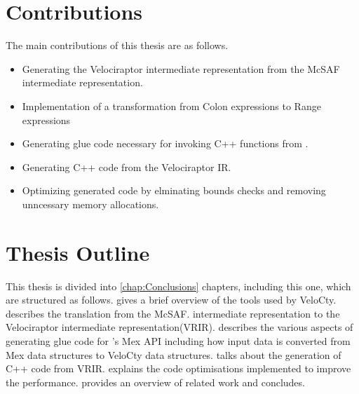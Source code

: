 \section{Contributions}
The main contributions of this thesis are as follows.
\begin{itemize}
\item Generating the Velociraptor\cite{velociraptor} intermediate representation from the McSAF\cite{doherty11} intermediate representation. 
\item Implementation of a transformation from  Colon expressions to Range expressions
\item Generating glue code necessary for invoking C++ functions from \matlab\cite{matlab}.
\item Generating C++ code from the Velociraptor\cite{velociraptor} IR.
\item Optimizing generated code by elminating bounds checks and removing unncessary memory allocations. 
\end{itemize}
\section{Thesis Outline}
This thesis is divided into \ref{chap:Conclusions} chapters, including this one, which are structured as follows.
 gives a brief overview of the tools
used by VeloCty.
 describes the translation from the McSAF\cite{doherty11}.
intermediate representation to the Velociraptor\cite{velociraptor} intermediate representation(VRIR).
 describes the various aspects of generating glue code for \matlab\cite{matlab}'s Mex API including how input data is converted from Mex data structures to VeloCty data structures. 
 talks about the generation of C++ code from VRIR.
 explains the code optimisations implemented to improve the performance. 
 provides an overview of related work and
 concludes.

